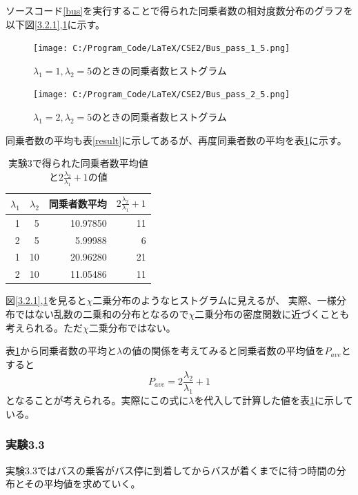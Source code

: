 \documentclass[a4paper,11pt,dvipdfmx]{jsarticle}
\begin{document}
ソースコード\ref{bus}を実行することで得られた同乗者数の相対度数分布のグラフを以下図\ref{3.2.1},\ref{3.2.2}に示す。
\begin{figure}[ht]
    \begin{minipage}[b]{0.48\columnwidth}
      \centering
      \texttt{[image: C:/Program\_Code/LaTeX/CSE2/Bus\_pass\_1\_5.png]}
      \caption{$\lambda_1=1,\lambda_2=5$のときの同乗者数ヒストグラム}
      \label{3.2.1}
    \end{minipage}
    \hspace{0.04\columnwidth} 
    \begin{minipage}[b]{0.48\columnwidth}
      \centering
      \texttt{[image: C:/Program\_Code/LaTeX/CSE2/Bus\_pass\_2\_5.png]}
      \caption{$\lambda_1=2,\lambda_2=5$のときの同乗者数ヒストグラム}
      \label{3.2.2}
    \end{minipage}
\end{figure}

同乗者数の平均も表\ref{result}に示してあるが、再度同乗者数の平均を表\ref{result_2}に示す。
\begin{table}[ht]
    \centering
    \caption{実験3で得られた同乗者数平均値と$2\frac{\lambda_2}{\lambda_1}+1$の値}
    \begin{tabular}{|r|r|r|r|} \hline
        $\lambda_1$ & $\lambda_2$ & 同乗者数平均 & $2\frac{\lambda_2}{\lambda_1}+1$  \\ \hline
        1 & 5  & 10.97850 & 11 \\ \hline
        2 & 5  & 5.99988  & 6  \\ \hline
        1 & 10 & 20.96280 & 21 \\ \hline
        2 & 10 & 11.05486 & 11 \\ \hline
    \end{tabular}
    \label{result_2}
\end{table}

図\ref{3.2.1},\ref{3.2.2}を見ると$\chi$二乗分布のようなヒストグラムに見えるが、
実際、一様分布ではない乱数の二乗和の分布となるので$\chi$二乗分布の密度関数に近づくことも考えられる。ただ$\chi$二乗分布ではない。

表\ref{result_2}から同乗者数の平均と$\lambda$の値の関係を考えてみると同乗者数の平均値を$P_{ave}$とすると
\begin{equation}
    P_{ave} = 2\frac{\lambda_2}{\lambda_1}+1
\end{equation}
となることが考えられる。実際にこの式に$\lambda$を代入して計算した値を表\ref{result_2}に示している。

\subsubsection{実験3.3}
実験3.3ではバスの乗客がバス停に到着してからバスが着くまでに待つ時間の分布とその平均値を求めていく。
\end{document}

